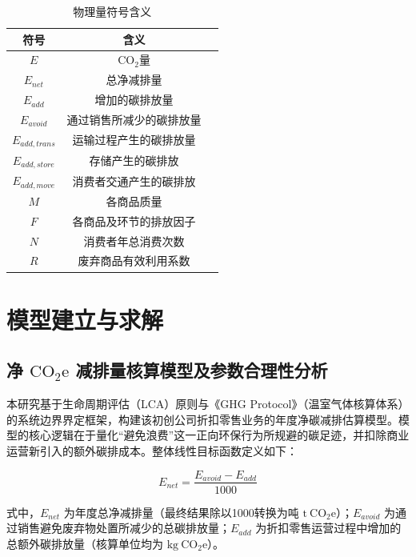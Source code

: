 \documentclass{article}
\begin{document}
\begin{table}[H]
\centering
\caption{物理量符号含义}
\begin{tabular}{|c|c|c|}
\hline 符号 & 含义 \\
\hline $E$ & $\mathrm{CO}_2$量 \\
\hline $E_{net}$ & 总净减排量 \\
\hline $E_{add}$ & 增加的碳排放量 \\
\hline $E_{avoid}$ & 通过销售所减少的碳排放量 \\
\hline $E_{add, trans}$ & 运输过程产生的碳排放量 \\
\hline $E_{add, store}$ & 存储产生的碳排放 \\
\hline $E_{add, move}$ & 消费者交通产生的碳排放 \\
\hline $M$ & 各商品质量 \\
\hline $F$ & 各商品及环节的排放因子 \\
\hline $N$ & 消费者年总消费次数 \\
\hline $R$ & 废弃商品有效利用系数 \\
\hline
\end{tabular}
\label{tab:symbols}
\end{table}


\section{模型建立与求解}

\subsection{净 $\mathrm{CO}_2\mathrm{e}$ 减排量核算模型及参数合理性分析}

本研究基于生命周期评估（LCA）原则与《GHG Protocol》（温室气体核算体系）的系统边界界定框架，构建该初创公司折扣零售业务的年度净碳减排估算模型。模型的核心逻辑在于量化“避免浪费”这一正向环保行为所规避的碳足迹，并扣除商业运营新引入的额外碳排成本。整体线性目标函数定义如下：

\begin{equation}
    E_{net} = \frac{E_{avoid} - E_{add}}{1000} \label{eq:net}
\end{equation}

式中，$E_{net}$ 为年度总净减排量（最终结果除以1000转换为吨 $\mathrm{t}\ \mathrm{CO}_2\mathrm{e}$）；$E_{avoid}$ 为通过销售避免废弃物处置所减少的总碳排放量；$E_{add}$ 为折扣零售运营过程中增加的总额外碳排放量（核算单位均为 $\mathrm{kg}\ \mathrm{CO}_2\mathrm{e}$）。
\end{document}
